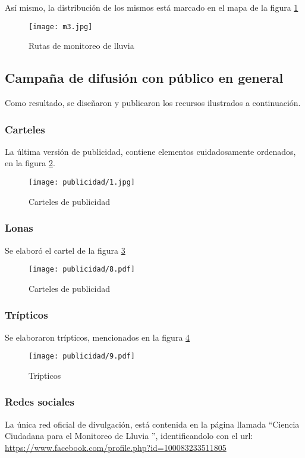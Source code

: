 Así mismo, la distribución de los mismos está marcado en el mapa de la figura \ref{m3}

\begin{figure}[h!]
\centering
  \texttt{[image: m3.jpg]}
  \caption{Rutas de monitoreo de lluvia}
  \label{m3}
\end{figure}



\subsection{Campaña de difusión con público en general}
Como resultado, se diseñaron y publicaron los recursos ilustrados a continuación.


\subsubsection{Carteles}
La última versión de publicidad, contiene elementos cuidadosamente ordenados, en la figura \ref{publicidad1}.

\begin{figure}[ht]
\centering
  \texttt{[image: publicidad/1.jpg]}
  \caption{Carteles de publicidad}
  \label{publicidad1}
\end{figure}

\subsubsection{Lonas}
Se elaboró el cartel de la figura \ref{publicidad7}
\begin{figure}[ht]
\centering
  \texttt{[image: publicidad/8.pdf]}
  \caption{Carteles de publicidad}
  \label{publicidad7}
\end{figure}

\subsubsection{Trípticos}
Se elaboraron trípticos, mencionados en la figura \ref{publicidad9}
\begin{figure}[ht]
\centering
  \texttt{[image: publicidad/9.pdf]}
  \caption{Trípticos}
  \label{publicidad9}
\end{figure}

\subsubsection{Redes sociales}
La única red oficial de divulgación, está contenida en la página llamada ``Ciencia Ciudadana para el Monitoreo de Lluvia '', identificandolo con el url: \url{https://www.facebook.com/profile.php?id=100083233511805}

